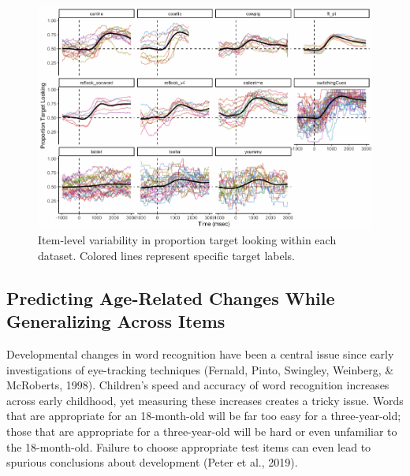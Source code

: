 \documentclass[10pt, letterpaper]{article}
\newenvironment{CodeChunk}{}{}
\begin{document}
\begin{CodeChunk}
\begin{figure}[h]

{\centering \includegraphics{figs/peekbank_item_vis-1} 

}

\caption[Item-level variability in proportion target looking within each dataset]{Item-level variability in proportion target looking within each dataset. Colored lines represent specific target labels.}\label{fig:peekbank_item_vis}
\end{figure}
\end{CodeChunk}

\hypertarget{predicting-age-related-changes-while-generalizing-across-items}{%
\subsection{Predicting Age-Related Changes While Generalizing Across
Items}\label{predicting-age-related-changes-while-generalizing-across-items}}

Developmental changes in word recognition have been a central issue
since early investigations of eye-tracking techniques (Fernald, Pinto,
Swingley, Weinberg, \& McRoberts, 1998). Children's speed and accuracy
of word recognition increases across early childhood, yet measuring
these increases creates a tricky issue. Words that are appropriate for
an 18-month-old will be far too easy for a three-year-old; those that
are appropriate for a three-year-old will be hard or even unfamiliar to
the 18-month-old. Failure to choose appropriate test items can even lead
to spurious conclusions about development (Peter et al., 2019).
\end{document}

